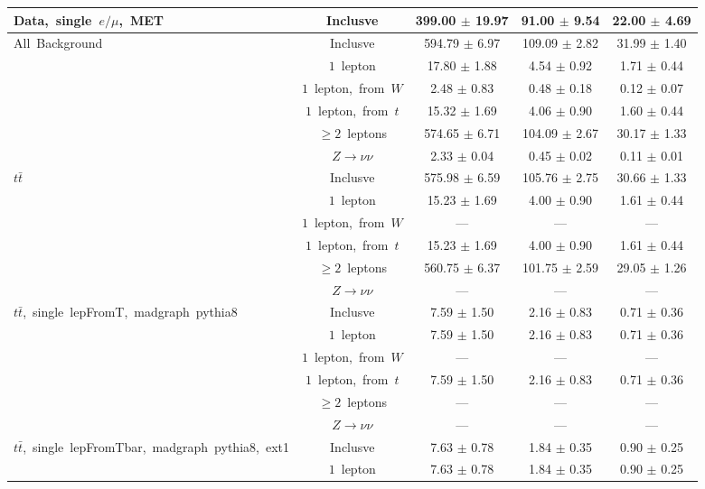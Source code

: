 \documentclass{article}
\begin{document}
\begin{longtable}{|l|c|c|c|c|}
\multirow{1}{*}{Data,~single~$e/\mu$,~MET} & Inclusve  & 399.00 $\pm$ 19.97  & 91.00 $\pm$ 9.54  & 22.00 $\pm$ 4.69 \\* 
\hline \hline 
\multirow{6}{*}{All~Background} & Inclusve  & 594.79 $\pm$ 6.97  & 109.09 $\pm$ 2.82  & 31.99 $\pm$ 1.40 \\* 
 & $1$~lepton  & 17.80 $\pm$ 1.88  & 4.54 $\pm$ 0.92  & 1.71 $\pm$ 0.44 \\* 
 & $1$~lepton,~from~$W$  & 2.48 $\pm$ 0.83  & 0.48 $\pm$ 0.18  & 0.12 $\pm$ 0.07 \\* 
 & $1$~lepton,~from~$t$  & 15.32 $\pm$ 1.69  & 4.06 $\pm$ 0.90  & 1.60 $\pm$ 0.44 \\* 
 & $\ge2$~leptons  & 574.65 $\pm$ 6.71  & 104.09 $\pm$ 2.67  & 30.17 $\pm$ 1.33 \\* 
 & $Z\rightarrow\nu\nu$  & 2.33 $\pm$ 0.04  & 0.45 $\pm$ 0.02  & 0.11 $\pm$ 0.01 \\* 
\hline 
\multirow{6}{*}{$t\bar{t}$} & Inclusve  & 575.98 $\pm$ 6.59  & 105.76 $\pm$ 2.75  & 30.66 $\pm$ 1.33 \\* 
 & $1$~lepton  & 15.23 $\pm$ 1.69  & 4.00 $\pm$ 0.90  & 1.61 $\pm$ 0.44 \\* 
 & $1$~lepton,~from~$W$  & ---  & ---  & --- \\* 
 & $1$~lepton,~from~$t$  & 15.23 $\pm$ 1.69  & 4.00 $\pm$ 0.90  & 1.61 $\pm$ 0.44 \\* 
 & $\ge2$~leptons  & 560.75 $\pm$ 6.37  & 101.75 $\pm$ 2.59  & 29.05 $\pm$ 1.26 \\* 
 & $Z\rightarrow\nu\nu$  & ---  & ---  & --- \\* 
\hline 
\multirow{6}{*}{$t\bar{t}$,~single~lepFromT,~madgraph~pythia8} & Inclusve  & 7.59 $\pm$ 1.50  & 2.16 $\pm$ 0.83  & 0.71 $\pm$ 0.36 \\* 
 & $1$~lepton  & 7.59 $\pm$ 1.50  & 2.16 $\pm$ 0.83  & 0.71 $\pm$ 0.36 \\* 
 & $1$~lepton,~from~$W$  & ---  & ---  & --- \\* 
 & $1$~lepton,~from~$t$  & 7.59 $\pm$ 1.50  & 2.16 $\pm$ 0.83  & 0.71 $\pm$ 0.36 \\* 
 & $\ge2$~leptons  & ---  & ---  & --- \\* 
 & $Z\rightarrow\nu\nu$  & ---  & ---  & --- \\* 
\hline 
\multirow{6}{*}{$t\bar{t}$,~single~lepFromTbar,~madgraph~pythia8,~ext1} & Inclusve  & 7.63 $\pm$ 0.78  & 1.84 $\pm$ 0.35  & 0.90 $\pm$ 0.25 \\* 
 & $1$~lepton  & 7.63 $\pm$ 0.78  & 1.84 $\pm$ 0.35  & 0.90 $\pm$ 0.25 \\* 

\end{longtable}
\end{document}
